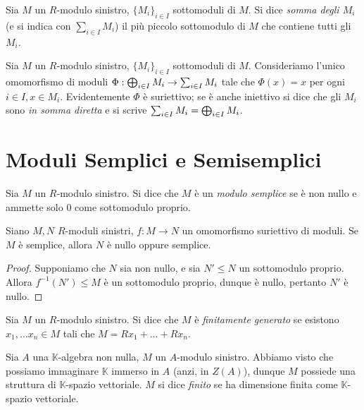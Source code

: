 \begin{definition}
Sia $M$ un $R$-modulo sinistro, $\{M_i\}_{i\in I}$ sottomoduli di $M$. Si dice \emph{somma degli $M_i$} (e si indica con $\sum_{i\in I}M_i$) il più piccolo sottomodulo di $M$ che contiene tutti gli $M_i$.
\end{definition}

\begin{definition}
Sia $M$ un $R$-modulo sinistro, $\{M_i\}_{i\in I}$ sottomoduli di $M$. Consideriamo l'unico omomorfismo di moduli $\Phi:\bigoplus_{i\in I}M_i\to\sum_{i\in I}M_i$ tale che $\Phi(x)=x$ per ogni $i\in I\comma x\in M_i$. Evidentemente $\Phi$ è suriettivo; se è anche iniettivo si dice che gli $M_i$ sono \emph{in somma diretta} e si scrive $\sum_{i\in I}M_i=\bigoplus_{i\in I}M_i$.
\end{definition}


\section{Moduli Semplici e Semisemplici}

\begin{definition}
Sia $M$ un $R$-modulo sinistro. Si dice che $M$ è un \emph{modulo semplice} se è non nullo e ammette solo $0$ come sottomodulo proprio.
\end{definition}

\begin{proposition}
Siano $M,N$ $R$-moduli sinistri, $f:M\to N$ un omomorfismo suriettivo di moduli. Se $M$ è semplice, allora $N$ è nullo oppure semplice.
\end{proposition}
\begin{proof}
Supponiamo che $N$ sia non nullo, e sia $N'\le N$ un sottomodulo proprio. Allora $f^{-1}(N')\le M$ è un sottomodulo proprio, dunque è nullo, pertanto $N'$ è nullo.
\end{proof}



\begin{definition}
Sia $M$ un $R$-modulo sinistro. Si dice che $M$ è \emph{finitamente generato} se esistono $x_1,\ldots x_n\in M$ tali che $M=Rx_1+\ldots+Rx_n$.
\end{definition}

\begin{definition}
Sia $A$ una $\mathbb{K}$-algebra non nulla, $M$ un $A$-modulo sinistro. Abbiamo visto che possiamo immaginare $\mathbb{K}$ immerso in $A$ (anzi, in $Z(A)$), dunque $M$ possiede una struttura di $\mathbb{K}$-spazio vettoriale. $M$ si dice \emph{finito} se ha dimensione finita come $\mathbb{K}$-spazio vettoriale.
\end{definition}

